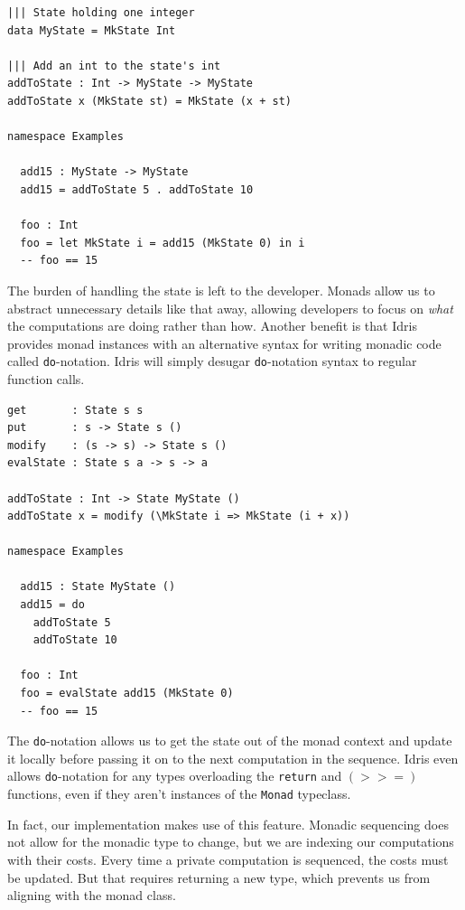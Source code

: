 \documentclass[12pt]{report}
\begin{document}
\begin{lstlisting}[float,caption={Threading state through function calls, no monad},label={lst:state_example}]
||| State holding one integer
data MyState = MkState Int

||| Add an int to the state's int
addToState : Int -> MyState -> MyState
addToState x (MkState st) = MkState (x + st)

namespace Examples

  add15 : MyState -> MyState
  add15 = addToState 5 . addToState 10

  foo : Int
  foo = let MkState i = add15 (MkState 0) in i
  -- foo == 15
\end{lstlisting}

The burden of handling the state is left to the developer.
Monads allow us to abstract unnecessary details like that away, allowing developers to focus on \textit{what} the computations are doing rather than how.
Another benefit is that Idris provides monad instances with an alternative syntax for writing monadic code called \texttt{do}-notation.
Idris will simply desugar \texttt{do}-notation syntax to regular function calls.

\begin{lstlisting}[float,caption={Threading state through function calls with do-notation},label={lst:threading_state_do_notation}]
get       : State s s
put       : s -> State s ()
modify    : (s -> s) -> State s ()
evalState : State s a -> s -> a

addToState : Int -> State MyState ()
addToState x = modify (\MkState i => MkState (i + x))

namespace Examples

  add15 : State MyState ()
  add15 = do
    addToState 5
    addToState 10

  foo : Int
  foo = evalState add15 (MkState 0)
  -- foo == 15
\end{lstlisting}

The \texttt{do}-notation allows us to get the state out of the monad context and update it locally before passing it on to the next computation in the sequence.
Idris even allows \texttt{do}-notation for any types overloading the \texttt{return} and $(>>=)$ functions, even if they aren't instances of the \texttt{Monad} typeclass.

In fact, our implementation makes use of this feature.
Monadic sequencing does not allow for the monadic type to change, but we are indexing our computations with their costs.
Every time a private computation is sequenced, the costs must be updated.
But that requires returning a new type, which prevents us from aligning with the monad class.
\end{document}
